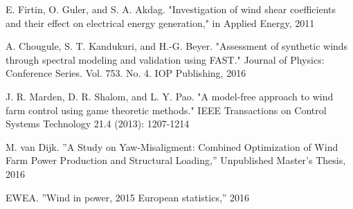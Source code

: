 \begin{thebibliography}{99}
E. Firtin, O. Guler, and S. A. Akdag. "Investigation of wind shear coefficients and their effect on electrical energy generation," in Applied Energy, 2011

A. Chougule, S. T. Kandukuri, and H.-G. Beyer. "Assessment of synthetic winds through spectral modeling and validation using FAST." Journal of Physics: Conference Series. Vol. 753. No. 4. IOP Publishing, 2016

J. R. Marden, D. R. Shalom, and L. Y. Pao. "A model-free approach to wind farm control using game theoretic methods." IEEE Transactions on Control Systems Technology 21.4 (2013): 1207-1214	


M. van Dijk. ''A Study on Yaw-Misaligment: Combined Optimization of Wind Farm Power Production and Structural Loading,'' Unpublished Master's Thesis, 2016

EWEA. ''Wind in power, 2015 European statistics,'' 2016










\end{thebibliography}